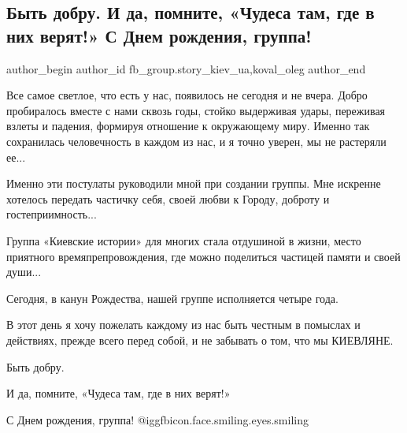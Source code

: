  
 
 
 
 
 
\subsection{Быть добру. И да, помните, «Чудеса там, где в них верят!» С Днем рождения, группа!}
\label{sec:24_12_2021.fb.fb_group.story_kiev_ua.4.birthday_byt_dobru}
 
\ifcmt
 author_begin
   author_id fb_group.story_kiev_ua,koval_oleg
 author_end
\fi

Все самое светлое, что есть у нас, появилось не сегодня и не вчера. Добро
пробиралось вместе с нами сквозь годы, стойко выдерживая удары, переживая
взлеты и падения, формируя отношение к окружающему миру. Именно так сохранилась
человечность в каждом из нас, и я точно уверен, мы не растеряли ее...


Именно эти постулаты руководили мной при создании группы. Мне искренне хотелось
передать частичку себя, своей любви к Городу, доброту и гостеприимность...

Группа «Киевские истории» для многих стала отдушиной в жизни, место приятного
времяпрепровождения, где можно поделиться частицей памяти и своей души...

Сегодня, в канун Рождества, нашей группе исполняется четыре года. 

В этот день я хочу пожелать каждому из нас быть честным в помыслах и действиях,
прежде всего перед собой, и не забывать о том, что мы КИЕВЛЯНЕ.

Быть добру.

И да, помните, «Чудеса там, где в них верят!»

С Днем рождения, группа!  @igg{fbicon.face.smiling.eyes.smiling} 

